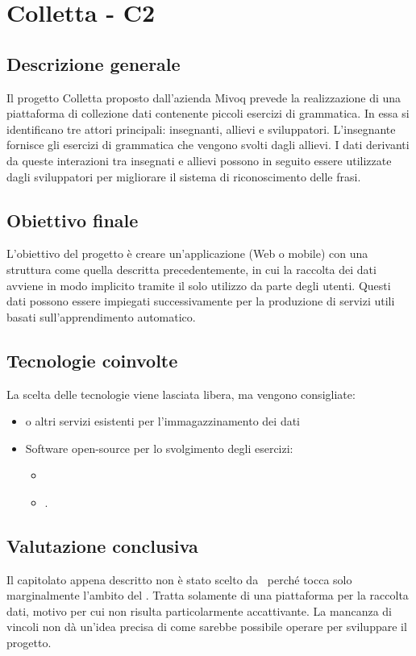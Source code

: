 \section{Colletta - C2} \label{c2}
    \subsection{Descrizione generale}
    Il progetto Colletta proposto dall'azienda Mivoq prevede la realizzazione di una piattaforma di collezione dati contenente piccoli esercizi di grammatica.
    In essa si identificano tre attori principali: insegnanti, allievi e sviluppatori. L'insegnante fornisce gli esercizi di grammatica che vengono svolti dagli allievi.
    I dati derivanti da queste interazioni tra insegnati e allievi possono in seguito essere utilizzate dagli sviluppatori per migliorare il sistema di riconoscimento delle frasi.

    \subsection{Obiettivo finale}
    L'obiettivo del progetto è creare un'applicazione (Web o mobile) con una struttura come quella descritta precedentemente,
    in cui la raccolta dei dati avviene in modo implicito tramite il solo utilizzo da parte degli utenti. Questi dati possono essere impiegati successivamente per la produzione di
    servizi utili basati sull'apprendimento automatico.

    \subsection{Tecnologie coinvolte}
    La scelta delle tecnologie viene lasciata libera, ma vengono consigliate:
        \begin{itemize}
            \item {} o altri servizi esistenti per l'immagazzinamento dei dati
            \item Software open-source per lo svolgimento degli esercizi:
            \begin{itemize}
                \item {} 
                \item {}.
            \end{itemize}
        \end{itemize}

    \subsection{Valutazione conclusiva}
    Il capitolato appena descritto non è stato scelto da \gruppo\ perché tocca solo marginalmente l'ambito del .
    Tratta solamente di una piattaforma per la raccolta dati, motivo per cui non risulta particolarmente accattivante.
    La mancanza di vincoli non dà un'idea precisa di come sarebbe possibile operare per sviluppare il progetto.

